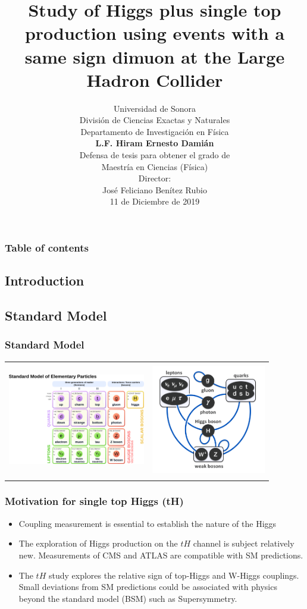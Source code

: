 \documentclass[11pt]{beamer}
\author{\scriptsize
 	Universidad de Sonora\\
 	\vspace{1px}
 	Divisi\'on de Ciencias Exactas y Naturales\\
 	\vspace{1px}
 	Departamento de Investigaci\'on en F\'isica\\
 	   \vspace{1px}
   \textbf{L.F. Hiram Ernesto Dami\'an}\\
   Defensa de tesis para obtener el grado de \\
      Maestr\'ia en Ciencias (F\'isica)\\
         \vspace{1px}
   Director:\\
   \vspace{1px}
   Jos\'e Feliciano Ben\'itez Rubio\\
\vspace{1px}
11 de Diciembre de 2019}
\title{Study of Higgs plus single top production using events with a same sign dimuon  at the Large Hadron Collider}
\date{}
\begin{document}
\begin{frame}
\titlepage
\end{frame}

\begin{frame}
	\frametitle{Table of contents}
\tiny
\tableofcontents
\end{frame}


\begin{frame}
\section{Introduction}
\subsection{Standard Model}
\frametitle{Standard Model}
\begin{table}
	\centering
\begin{tabular}{cc}
\includegraphics[width=6cm,height=5cm]{figures/sm1.png} & \includegraphics[width=5cm,height=5cm]{figures/sm.png}
\end{tabular}
\end{table}
\end{frame}

\begin{frame}
\frametitle{Motivation  for single top Higgs (tH)}
\begin{itemize}
\item Coupling measurement is essential to establish the nature of the Higgs
\item The exploration of Higgs production on the $tH$ channel is subject relatively new. Measurements of CMS and ATLAS are compatible with SM predictions.
\item The $tH$ study explores the relative sign of top-Higgs  and W-Higgs couplings.\\ Small deviations from SM predictions could be associated with physics beyond the
standard model (BSM) such as Supersymmetry.
\end{itemize}
\end{frame}
\end{document}
